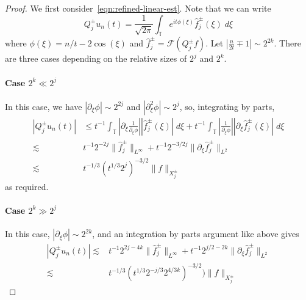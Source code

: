 \documentclass[letterpaper, reqno,final]{amsart}
\newcommand{\bbT}{\mathbb{T}}
\begin{document}
\begin{proof}
    We first consider~\eqref{eqn:refined-linear-est}.  Note that we can write
    \begin{equation*}
        Q^{\pm}_j u_n(t) = \frac{1}{\sqrt{2\pi}} \int_\bbT e^{it\phi(\xi)} \hat{f}^{\pm}_j(\xi) \;d\xi
    \end{equation*}
    where $\phi(\xi) = n/t - 2 \cos(\xi)$ and $\hat{f}^{\pm}_j = \mathcal{F}(Q^\pm_j f)$.  Let  $|\frac{n}{2t} \mp 1| \sim 2^{2k}$.  There are three cases depending on the relative sizes of $2^{j}$ and $2^k$.
    
    \paragraph{Case $2^k \ll 2^{j}$} In this case, we have $|\partial_\xi \phi| \sim 2^{2j}$ and $|\partial_\xi^2 \phi| \sim 2^j$, so, integrating by parts,
    \begin{equation*}\begin{split}
        \left|Q^\pm_j u_n(t)\right| &\leq t^{-1} \int_{\bbT} \left| \partial_\xi \frac{1}{\partial_\xi \phi}\right| |\hat f^\pm_j(\xi)|\;d\xi + t^{-1} \int_{\bbT} \left|\frac{1}{\partial_\xi \phi}\right| |\partial_\xi \hat f^\pm_j(\xi)|\;d\xi\\
        \lesssim& t^{-1} 2^{-2j} \lVert \hat{f}^{\pm}_j \rVert_{L^\infty} + t^{-1} 2^{-3/2j} \lVert \partial_\xi \hat{f}^\pm_j \rVert_{L^2}\\
        \lesssim& t^{-1/3} (t^{1/3} 2^j)^{-3/2} \lVert f \rVert_{X^\pm_j}
   \end{split}\end{equation*}
   as required.  
   
   \paragraph{Case $2^k \gg 2^{j}$} In this case, $|\partial_\xi \phi| \sim 2^{2k}$, and an integration by parts argument like above gives
   \begin{equation*}\begin{split}
       \left|Q^\pm_j u_n(t)\right| \lesssim& t^{-1} 2^{2j-4k} \lVert \hat{f}^{\pm}_j \rVert_{L^\infty} + t^{-1} 2^{j/2 - 2k} \lVert \partial_\xi \hat{f}^\pm_j \rVert_{L^2}\\
       \lesssim& t^{-1/3} (t^{1/3} 2^{-j/3} 2^{4/3k})^{-3/2})\lVert f \rVert_{X^\pm_j}
   \end{split}\end{equation*}
   

\end{proof}
\end{document}
